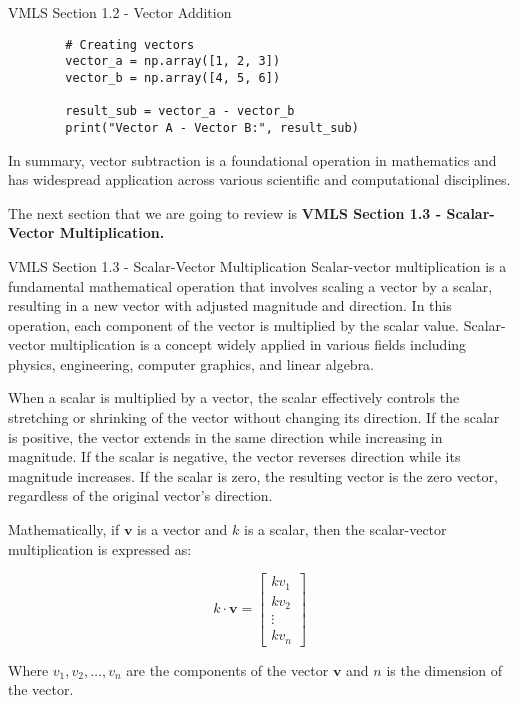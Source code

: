 \begin{notes}{VMLS Section 1.2 - Vector Addition}
\begin{Highlight}
\begin{verbatim}
        # Creating vectors
        vector_a = np.array([1, 2, 3])
        vector_b = np.array([4, 5, 6])
        
        result_sub = vector_a - vector_b
        print("Vector A - Vector B:", result_sub)        
        \end{verbatim}
    \end{Highlight}

    In summary, vector subtraction is a foundational operation in mathematics and has widespread application across various scientific and computational disciplines.
\end{notes}

The next section that we are going to review is \textbf{VMLS Section 1.3 - Scalar-Vector Multiplication.}

\begin{notes}{VMLS Section 1.3 - Scalar-Vector Multiplication}
    Scalar-vector multiplication is a fundamental mathematical operation that involves scaling a vector by a scalar, resulting in a new vector with adjusted magnitude and direction. In this operation, each component of 
    the vector is multiplied by the scalar value. Scalar-vector multiplication is a concept widely applied in various fields including physics, engineering, computer graphics, and linear algebra.

    When a scalar is multiplied by a vector, the scalar effectively controls the stretching or shrinking of the vector without changing its direction. If the scalar is positive, the vector extends in the same direction 
    while increasing in magnitude. If the scalar is negative, the vector reverses direction while its magnitude increases. If the scalar is zero, the resulting vector is the zero vector, regardless of the original vector's 
    direction.

    \begin{Highlight}
        Mathematically, if \(\mathbf{v}\) is a vector and \(k\) is a scalar, then the scalar-vector multiplication is expressed as:
    
        \[
        k \cdot \mathbf{v} = \begin{bmatrix} kv_1 \\ kv_2 \\ \vdots \\ kv_n \end{bmatrix}
        \]
    
        Where \(v_1, v_2, \ldots, v_n\) are the components of the vector \(\mathbf{v}\) and \(n\) is the dimension of the vector.
    \end{Highlight}


\end{notes}
